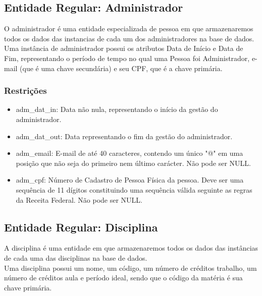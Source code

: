 \documentclass{article}
\begin{document}
  	\subsection{Entidade Regular: Administrador}
  	    \quad O administrador é uma entidade especializada de pessoa em que armazenaremos todos os dados  das instancias de cada um dos administradores na base de dados. \\
  	    \quad Uma instância de administrador possui os atributos Data de Início e Data de Fim, representando o período de tempo no qual uma Pessoa foi Administrador, e-mail (que é uma chave secundária) e seu CPF, que é a chave primária.
  	    \subsubsection{Restrições}
  	        \begin{itemize}
  	            \item adm\_dat\_in: Data não nula, representando o início da gestão do administrador.
  	            \item adm\_dat\_out: Data representando o fim da gestão do administrador.
  	            \item adm\_email: E-mail de até 40 caracteres, contendo um único "@" em uma posição que não seja do primeiro nem último carácter. Não pode ser NULL.
  	            \item adm\_cpf: Número de Cadastro de Pessoa Física da pessoa. Deve ser uma sequência de 11 dígitos constituindo uma sequência válida seguinte as regras da Receita Federal. Não pode ser NULL.
  	        \end{itemize}
  	        
  	\subsection{Entidade Regular: Disciplina}
  	    \quad A disciplina é uma entidade em que armazenaremos todos os dados das instâncias de cada uma das disciplinas na base de dados. \\
  	    \quad Uma disciplina possui um nome, um código, um número de créditos trabalho, um número de créditos aula e período ideal, sendo que o código da matéria é sua chave primária.
\end{document}
